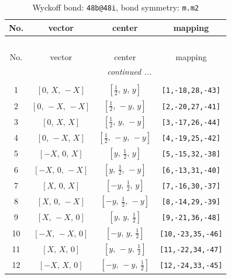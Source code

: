 \documentclass[fleqn,8pt]{jsarticle}
\begin{document}
\renewcommand{\arraystretch}{1.2}
\begin{longtable}{cccc}
\caption{Wyckoff bond: {\tt 48b@48i}, bond symmetry: {\tt m.m2}}
 \\
 \hline \hline
No. & vector & center & mapping \\ \hline \endfirsthead

\multicolumn{3}{l}{\tablename\ \thetable{}} \\
 \hline \hline
No. & vector & center & mapping \\ \hline \endhead

 \hline \hline
\multicolumn{3}{r}{\footnotesize\it continued ...} \\ \endfoot

 \hline \hline
\multicolumn{3}{r}{} \\ \endlastfoot

1 & $\left[ 0,\, X,\, - X \right]$ & $\left[ \frac{1}{2},\, y,\, y \right]$ & {\tt [1,-18,28,-43]} \\ \hline
2 & $\left[ 0,\, - X,\, - X \right]$ & $\left[ \frac{1}{2},\, - y,\, y \right]$ & {\tt [2,-20,27,-41]} \\ \hline
3 & $\left[ 0,\, X,\, X \right]$ & $\left[ \frac{1}{2},\, y,\, - y \right]$ & {\tt [3,-17,26,-44]} \\ \hline
4 & $\left[ 0,\, - X,\, X \right]$ & $\left[ \frac{1}{2},\, - y,\, - y \right]$ & {\tt [4,-19,25,-42]} \\ \hline
5 & $\left[ - X,\, 0,\, X \right]$ & $\left[ y,\, \frac{1}{2},\, y \right]$ & {\tt [5,-15,32,-38]} \\ \hline
6 & $\left[ - X,\, 0,\, - X \right]$ & $\left[ y,\, \frac{1}{2},\, - y \right]$ & {\tt [6,-13,31,-40]} \\ \hline
7 & $\left[ X,\, 0,\, X \right]$ & $\left[ - y,\, \frac{1}{2},\, y \right]$ & {\tt [7,-16,30,-37]} \\ \hline
8 & $\left[ X,\, 0,\, - X \right]$ & $\left[ - y,\, \frac{1}{2},\, - y \right]$ & {\tt [8,-14,29,-39]} \\ \hline
9 & $\left[ X,\, - X,\, 0 \right]$ & $\left[ y,\, y,\, \frac{1}{2} \right]$ & {\tt [9,-21,36,-48]} \\ \hline
10 & $\left[ - X,\, - X,\, 0 \right]$ & $\left[ - y,\, y,\, \frac{1}{2} \right]$ & {\tt [10,-23,35,-46]} \\ \hline
11 & $\left[ X,\, X,\, 0 \right]$ & $\left[ y,\, - y,\, \frac{1}{2} \right]$ & {\tt [11,-22,34,-47]} \\ \hline
12 & $\left[ - X,\, X,\, 0 \right]$ & $\left[ - y,\, - y,\, \frac{1}{2} \right]$ & {\tt [12,-24,33,-45]} \\
\end{longtable}
\end{document}

